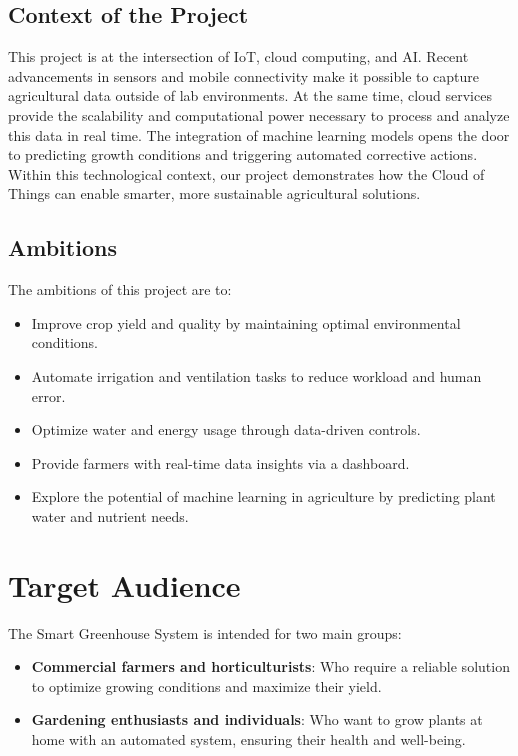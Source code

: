 \documentclass{report}
\begin{document}
\section{Context of the Project}
This project is at the intersection of IoT, cloud computing, and AI. Recent advancements in sensors and mobile connectivity make it possible to capture agricultural data outside of lab environments. At the same time, cloud services provide the scalability and computational power necessary to process and analyze this data in real time. The integration of machine learning models opens the door to predicting growth conditions and triggering automated corrective actions. Within this technological context, our project demonstrates how the Cloud of Things can enable smarter, more sustainable agricultural solutions.

\section{Ambitions}
The ambitions of this project are to:
\begin{itemize}
    \item Improve crop yield and quality by maintaining optimal environmental conditions.
    \item Automate irrigation and ventilation tasks to reduce workload and human error.
    \item Optimize water and energy usage through data-driven controls.
    \item Provide farmers with real-time data insights via a dashboard.
    \item Explore the potential of machine learning in agriculture by predicting plant water and nutrient needs.
\end{itemize}

\chapter{Target Audience}
The Smart Greenhouse System is intended for two main groups:
\begin{itemize}
    \item \textbf{Commercial farmers and horticulturists}: Who require a reliable solution to optimize growing conditions and maximize their yield.
    \item \textbf{Gardening enthusiasts and individuals}: Who want to grow plants at home with an automated system, ensuring their health and well-being.
\end{itemize}
\end{document}

